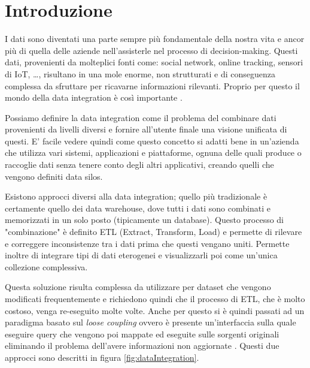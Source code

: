 \chapter{Introduzione}
\label{cha:intro}

I dati sono diventati una parte sempre più fondamentale della nostra vita e ancor più di quella delle aziende nell'assisterle nel processo di decision-making.
Questi dati, provenienti da molteplici fonti come: social network, online tracking, sensori di IoT, \dots, risultano in una mole enorme, non strutturati e
di conseguenza complessa da sfruttare per ricavarne informazioni rilevanti.
Proprio per questo il mondo della data integration è così importante \cite{DataIntegration}.

Possiamo definire la data integration come il problema del combinare dati provenienti da livelli diversi e fornire all'utente finale una 
visione unificata di questi\cite{dataIntegrationDef}. E' facile vedere quindi come questo concetto si adatti bene in un'azienda che utilizza vari sistemi, applicazioni 
e piattaforme, ognuna delle quali produce o raccoglie dati senza tenere conto degli altri applicativi, creando quelli che vengono definiti data silos.

Esistono approcci diversi alla data integration; quello più tradizionale è certamente quello dei data warehouse, dove tutti i dati sono combinati e memorizzati in un solo posto (tipicamente un database). 
Questo processo di "combinazione" è definito ETL (Extract, Transform, Load) e permette di rilevare e correggere inconsistenze tra i dati prima che questi vengano uniti. Permette inoltre di integrare 
tipi di dati eterogenei e visualizzarli poi come un'unica collezione complessiva.

Questa soluzione risulta complessa da utilizzare per dataset che vengono modificati frequentemente e richiedono quindi che il processo di ETL, che è molto costoso, venga re-eseguito molte volte.
Anche per questo si è quindi passati ad un paradigma basato sul \textit{loose coupling} ovvero è presente un'interfaccia sulla quale eseguire query che vengono poi mappate ed eseguite sulle sorgenti originali eliminando il 
problema dell'avere informazioni non aggiornate \cite{DataIntegrationHistory}. Questi due approcci sono descritti in figura \ref{fig:dataIntegration}.

